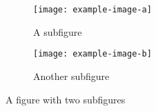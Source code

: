 \documentclass{article}
\begin{document}
\begin{figure}
\centering
\begin{subfigure}{.5\textwidth}
  \centering
  \texttt{[image: example-image-a]}
  \caption{A subfigure}
  \label{fig:sub1}
\end{subfigure}%
\begin{subfigure}{.5\textwidth}
  \centering
  \texttt{[image: example-image-b]}
  \caption{Another subfigure}
  \label{fig:sub2}
\end{subfigure}
\caption{A figure with two subfigures}
\label{fig:test}
\end{figure}
\end{document}

